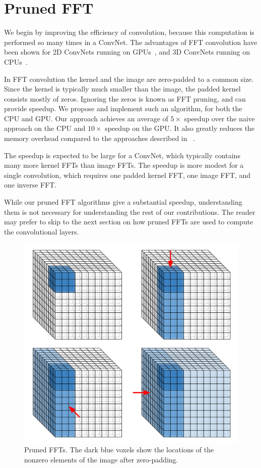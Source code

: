 \documentclass[conference]{./IEEEtran/IEEEtran}
\begin{document}
\section{Pruned FFT}
  We begin by improving the efficiency of convolution, because this
  computation is performed so many times in a ConvNet.  The advantages
  of FFT convolution have been shown for 2D ConvNets running on
  GPUs~\cite{mathieu-iclr-14,vasilache2014fast}, and 3D ConvNets
  running on CPUs~\cite{zlateski2015znn}.

  In FFT convolution the kernel and the image are zero-padded to a
  common size.  Since the kernel is typically much smaller than the
  image, the padded kernel consists mostly of zeros.  Ignoring the
  zeros is known as FFT pruning, and can provide speedup.  We propose
  and implement such an algorithm, for both the CPU and GPU. Our
  approach achieves an average of $5 \times$ speedup over the naive
  approach on the CPU and $10 \times$ speedup on the GPU.  It also
  greatly reduces the memory overhead compared to the approaches
  described in ~\cite{mathieu-iclr-14,vasilache2014fast}.

  The speedup is expected to be large for a ConvNet, which typically
  contains many more kernel FFTs than image FFTs.  The speedup is more
  modest for a single convolution, which requires one padded kernel
  FFT, one image FFT, and one inverse FFT.

  While our pruned FFT algorithms give a substantial speedup,
  understanding them is not necessary for understanding the rest of
  our contributions.  The reader may prefer to skip to the next
  section on how pruned FFTs are used to compute the convolutional
  layers.

  \begin{figure}
    \begin{center}
      \includegraphics[width=0.55\columnwidth]{fig/pruned_ffts.pdf}
    \end{center}
    \caption{Pruned FFTs. The dark blue voxels show the locations of the nonzero elements of the image after zero-padding. }
    \label{fig:pruned_ffts}
  \end{figure}
\end{document}
